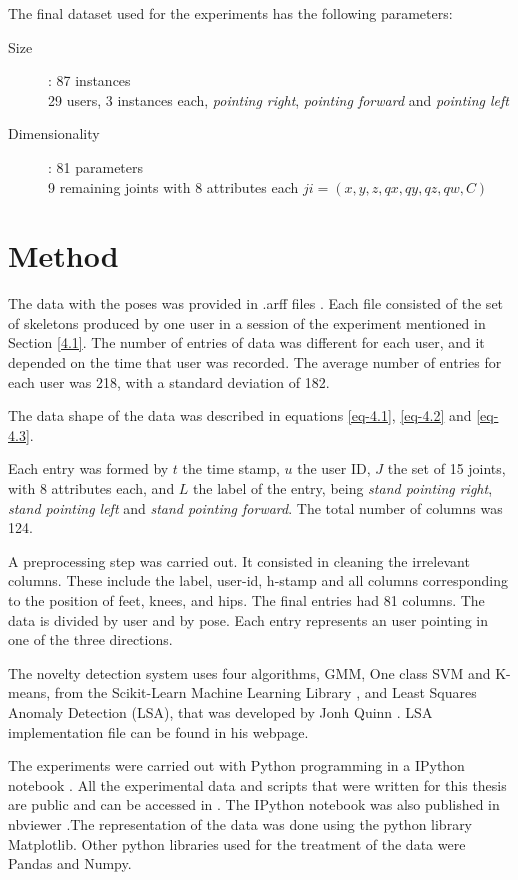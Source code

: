 The final dataset used for the experiments has the following parameters:

\begin{description}
\item[Size]: 87 instances \\ 29 users, 3 instances each, \emph{pointing right}, \emph{pointing forward} and  \emph{pointing left}
\item[Dimensionality]: 81 parameters \\ 9 remaining joints with 8 attributes each $ji = (x,y,z,qx,qy,qz,qw,C)$
\end{description}

\section{Method} \label{4.3}

The data with the poses was provided in .arff files \cite{arff}. Each file consisted of the set of skeletons produced by one user in a session of the experiment mentioned in Section \ref{4.1}. The number of entries of data was different for each user, and it depended on the time that user was recorded. The average number of entries for each user was 218, with a standard deviation of 182. 

The data shape of the data was described in equations \ref{eq-4.1}, \ref{eq-4.2} and \ref{eq-4.3}.

Each entry was formed by $t$ the time stamp, $u$ the user ID, $J$ the set of 15 joints, with 8 attributes each, and $L$ the label of the entry, being \emph{stand pointing right}, \emph{stand pointing left} and \emph{stand pointing forward}. The total number of columns was 124.

A preprocessing step was carried out. It consisted in cleaning the irrelevant columns. These include the label, user-id, h-stamp and all columns corresponding to the position of feet, knees, and hips. The final entries had 81 columns. The data is divided by user and by pose. Each entry represents an user pointing in one of the three directions.

The  novelty detection system uses four algorithms, GMM, One class SVM and K-means, from the Scikit-Learn Machine Learning Library \cite{scikit-learn}, and  Least Squares Anomaly Detection (LSA), that was developed by Jonh Quinn \cite{lsa}. LSA implementation file can be found in his webpage. 

The experiments were carried out with Python \cite{python} programming in a IPython notebook \cite{ipython}. All the experimental data and scripts that were written for this thesis are public and can be accessed in \cite{github}. The IPython notebook was also published in nbviewer \cite{notebook}.The representation of the data was done using the python library Matplotlib\cite{matplotlib}. Other python libraries used for the treatment of the data were Pandas\cite{pandas} and Numpy\cite{numpy}.

